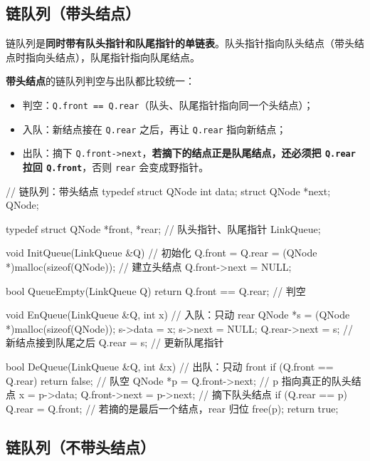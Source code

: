 \documentclass[11pt,openany,UTF8]{ctexbook}
\begin{document}
\subsection{链队列（带头结点）}

链队列是\textbf{同时带有队头指针和队尾指针的单链表}。队头指针指向队头结点（带头结点时指向头结点），队尾指针指向队尾结点。

\textbf{带头结点}的链队列判空与出队都比较统一：

\begin{itemize}
\item 判空：\texttt{Q.front =\allowbreak{}=\allowbreak{} Q.rear}（队头、队尾指针指向同一个头结点）；
\item 入队：新结点接在 \texttt{Q.rear} 之后，再让 \texttt{Q.rear} 指向新结点；
\item 出队：摘下 \texttt{Q.front->\allowbreak{}next}，\textbf{若摘下的结点正是队尾结点，还必须把 \texttt{Q.rear} 拉回 \texttt{Q.front}}，否则 \texttt{rear} 会变成野指针。
\end{itemize}
\begin{codebox}
// 链队列：带头结点
typedef struct QNode {
    int data;
    struct QNode *next;
} QNode;

typedef struct {
    QNode *front, *rear;     // 队头指针、队尾指针
} LinkQueue;

void InitQueue(LinkQueue &Q) {                       // 初始化
    Q.front = Q.rear = (QNode *)malloc(sizeof(QNode));  // 建立头结点
    Q.front->next = NULL;
}

bool QueueEmpty(LinkQueue Q) { return Q.front == Q.rear; }   // 判空

void EnQueue(LinkQueue &Q, int x) {                  // 入队：只动 rear
    QNode *s = (QNode *)malloc(sizeof(QNode));
    s->data = x;
    s->next = NULL;
    Q.rear->next = s;                                // 新结点接到队尾之后
    Q.rear = s;                                      // 更新队尾指针
}

bool DeQueue(LinkQueue &Q, int &x) {                 // 出队：只动 front
    if (Q.front == Q.rear) return false;             // 队空
    QNode *p = Q.front->next;                        // p 指向真正的队头结点
    x = p->data;
    Q.front->next = p->next;                         // 摘下队头结点
    if (Q.rear == p) Q.rear = Q.front;               // 若摘的是最后一个结点，rear 归位
    free(p);
    return true;
}
\end{codebox}

\subsection{链队列（不带头结点）}
\end{document}
